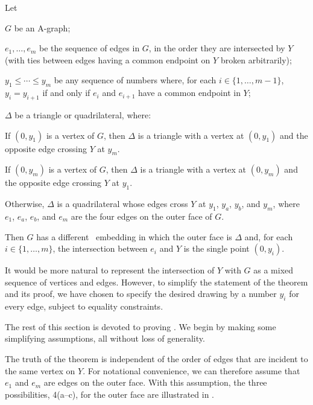 \begin{thm}
	Let
	\begin{compactenum}
		\item $G$ be an A-graph;
		\item $e_1,\ldots,e_m$ be the sequence of edges in $G$,
		in the order they are intersected by $Y$ (with ties between edges having a common endpoint on $Y$ broken arbitrarily);
		\item $y_1\le\cdots\le y_m$ be any sequence of numbers where, for
		each $i\in\{1,\ldots,m-1\}$, $y_i=y_{i+1}$ if and only if $e_i$
		and $e_{i+1}$ have a common endpoint in $Y$;
		\item $\Delta$ be a triangle or quadrilateral, where:
		\begin{compactenum}
			\item If $(0,y_1)$ is a vertex of $G$, then $\Delta$ is a triangle
			with a vertex at $(0,y_1)$ and the opposite edge crossing $Y$ at $y_m$.
			
			\item If $(0,y_m)$ is a vertex of $G$, then $\Delta$ is a triangle
			with a vertex at $(0,y_m)$ and the opposite edge crossing $Y$ at $y_1$.
			
			\item Otherwise, $\Delta$ is a quadrilateral whose edges cross $Y$ at $y_1$, $y_a$,
			$y_b$, and $y_m$, where $e_1$, $e_a$, $e_b$, and $e_m$ are the four edges on the outer face of $G$.
		\end{compactenum}
	\end{compactenum}
	Then $G$ has a different
	\Fary\ embedding in which the outer face is $\Delta$
	and, for each $i\in\{1,\ldots,m\}$, the intersection between $e_i$ and $Y$
	is the single point $(0,y_i)$.
\end{thm}

It would be more natural to represent the intersection of $Y$ with $G$
as a mixed sequence of vertices and edges. However, to simplify the
statement of the theorem and its proof, we have chosen to specify the
desired drawing by a number $y_i$ for every edge, subject to equality
constraints.

The rest of this section is devoted to proving . We begin by making some simplifying assumptions, all without loss of generality. 

The truth of the theorem is independent of the order of edges that are
incident to the same vertex on $Y$. For notational convenience,  we
can therefore assume that $e_1$ and $e_m$ are edges on the outer face.
With this assumption, the three possibilities, 4(a--c), for the
outer face are illustrated in .

